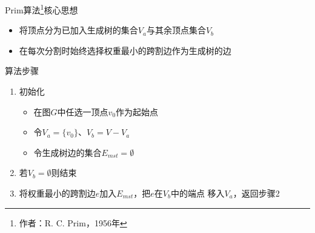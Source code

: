 \begin{fragile}
    \frametitle{\insertsectionhead}
    \begin{block}{Prim算法\footnote{作者：R. C. Prim，1956年}核心思想}
        \begin{itemize}
            \item 将顶点分为已加入生成树的集合$V_{a}$与其余顶点集合$V_{b}$
            \item 在每次分割时始终选择权重\alert{最小}的跨割边作为生成树的边
        \end{itemize}
    \end{block}
    \begin{exampleblock}{算法步骤}
        \begin{enumerate}
            \item 初始化
                  \begin{itemize}
                      \item 在图$G$中任选一顶点$v_{0}$作为起始点
                      \item 令$V_{a}=\{v_{0}\}$、$V_{b}=V-V_{a}$
                      \item 令生成树边的集合$E_{mst}=\emptyset$
                  \end{itemize}
            \item 若$V_{b}=\emptyset$则结束
            \item 将权重最小的跨割边$e$加入$E_{mst}$，把$e$在$V_{b}$中的端点
                  移入$V_{a}$，返回步骤2
        \end{enumerate}
    \end{exampleblock}
\end{fragile}

